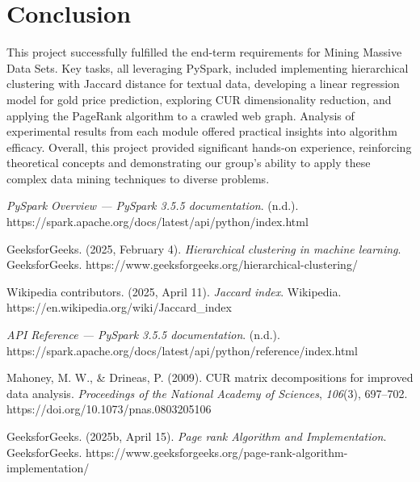 \documentclass[conference]{IEEEtran}
\begin{document}
    \section{Conclusion}
    \label{sec:conclusion}
    This project successfully fulfilled the end-term requirements for Mining Massive Data Sets.
    Key tasks, all leveraging PySpark, included implementing hierarchical clustering with Jaccard distance for textual data, developing a linear regression model for gold price prediction, exploring CUR dimensionality reduction, and applying the PageRank algorithm to a crawled web graph.
    Analysis of experimental results from each module offered practical insights into algorithm efficacy.
    Overall, this project provided significant hands-on experience, reinforcing theoretical concepts and demonstrating our group's ability to apply these complex data mining techniques to diverse problems.

    \begin{thebibliography}{00}
        \textit{PySpark Overview — PySpark 3.5.5 documentation}.
        (n.d.). https://spark.apache.org/docs/latest/api/python/index.html

        GeeksforGeeks.
        (2025, February 4). \textit{Hierarchical clustering in machine learning}.
        GeeksforGeeks.
        https://www.geeksforgeeks.org/hierarchical-clustering/

        Wikipedia contributors.
        (2025, April 11). \textit{Jaccard index}.
        Wikipedia.
        https://en.wikipedia.org/wiki/Jaccard\_index

        \textit{API Reference — PySpark 3.5.5 documentation}.
        (n.d.). https://spark.apache.org/docs/latest/api/python/reference/index.html

        Mahoney, M. W., \& Drineas, P. (2009).
        CUR matrix decompositions for improved data analysis. \textit{Proceedings of the National Academy of Sciences}, \textit{106}(3), 697–702.
        https://doi.org/10.1073/pnas.0803205106

        GeeksforGeeks.
        (2025b, April 15). \textit{Page rank Algorithm and Implementation}.
        GeeksforGeeks.
        https://www.geeksforgeeks.org/page-rank-algorithm-implementation/
    \end{thebibliography}
\end{document}
